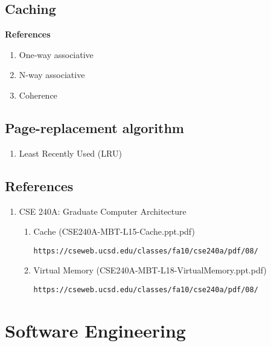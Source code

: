\documentclass[12pt,a4paper]{article}
\begin{document}
\subsection{Caching}

\textbf{References}

\begin{enumerate}
\item One-way associative
\item N-way associative
\item Coherence
\end{enumerate}

\subsection{Page-replacement algorithm}

\begin{enumerate}

\item Least Recently Used (LRU)

\end{enumerate}

\subsection{References}

\begin{enumerate}

\item CSE 240A: Graduate Computer Architecture

	\begin{enumerate}

	\item Cache (CSE240A-MBT-L15-Cache.ppt.pdf)

	\texttt{https://cseweb.ucsd.edu/classes/fa10/cse240a/pdf/08/}

	\item Virtual Memory (CSE240A-MBT-L18-VirtualMemory.ppt.pdf)

	\texttt{https://cseweb.ucsd.edu/classes/fa10/cse240a/pdf/08/}

	\end{enumerate}

\end{enumerate}

\section{Software Engineering}
\end{document}
